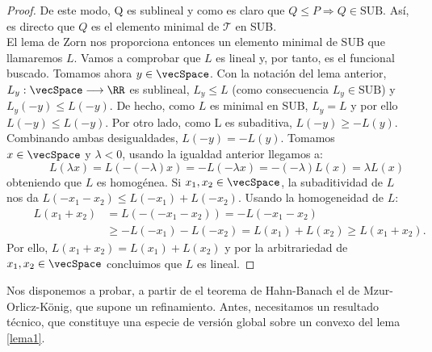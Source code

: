 \begin{proof}
		De este modo, Q es sublineal y como es claro que $ Q \leq P \Longrightarrow Q \in \text{SUB} $. Así, es directo que $ Q $ es el elemento minimal de $ \mathcal{T} $ en SUB.\\
		
		El lema de Zorn nos proporciona entonces un elemento minimal de SUB que llamaremos $ L $. Vamos a comprobar que $ L $ es lineal y, por tanto, es el funcional buscado. Tomamos ahora $ y \in \vecSpace $. Con la notación del lema anterior, $ L_y : \vecSpace \longrightarrow \RR $ es sublineal, $ L_y \leq L $ (como consecuencia $ L_y \in \text{SUB} $) y $ L_y (-y) \leq L(-y) $. De hecho, como $ L $ es minimal en SUB, $ L_y = L $ y por ello $ L (-y) \leq L(-y) $. Por otro lado, como L es subaditiva, $ L(-y) \geq -L(y) $. Combinando ambas desigualdades, $ L(-y) = -L(y) $. Tomamos $ x \in \vecSpace $ y $ \lambda < 0 $, usando la igualdad anterior llegamos a:
		\[ \qquad \quad
		L(\lambda x) = L (-(-\lambda)x) = -L(-\lambda x) = -(-\lambda)L(x) = \lambda L(x) \label{1}
		\] 
		obteniendo que $ L $ es homogénea. Si $ x_1, x_2 \in \vecSpace $, la subaditividad de $ L $ nos da $ L(-x_1-x_2) \leq L(-x_1) + L(-x_2) $. Usando la homogeneidad de $ L $:
		\begin{equation*}
		\begin{split} \qquad
		L(x_1+x_2) &= L(-(-x_1-x_2)) = -L(-x_1-x_2) \\ 
		& \geq -L(-x_1)-L(-x_2) = L(x_1) + L (x_2) \geq L(x_1+x_2). 
		\end{split}
		\end{equation*}
		Por ello, $	L(x_1+x_2) = L(x_1) + L (x_2) $ y por la arbitrariedad de $ x_1, x_2 \in \vecSpace $ concluimos que $ L $ es lineal.
		
	\end{proof}
\bigskip

Nos disponemos a probar, a partir de el teorema de Hahn-Banach el de Mzur-Orlicz-König, que supone un refinamiento. Antes, necesitamos un resultado técnico, que constituye una especie de versión global sobre un convexo del lema \ref{lema1}.
	
